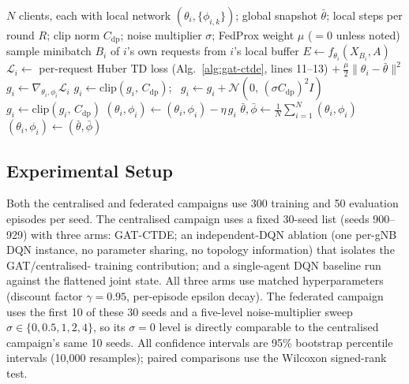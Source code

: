 \documentclass[pdflatex,sn-basic,Numbered]{sn-jnl}%
\begin{document}
\begin{algorithm}[t]
\caption{Federated GAT-CTDE round with DP-SGD}
\label{alg:fed-dp}
\begin{algorithmic}[1]
\REQUIRE $N$ clients, each with local network $(\theta_i, \{\phi_{i,k}\})$; global snapshot $\bar\theta$; local steps per round $R$; clip norm $C_{\text{dp}}$; noise multiplier $\sigma$; FedProx weight $\mu$ ($=0$ unless noted)
    \STATE sample minibatch $B_i$ of $i$'s own requests from $i$'s local buffer
    \STATE $E \gets f_{\theta_i}(X_{B_i}, A)$ 
    \STATE $\mathcal{L}_i \gets$ per-request Huber TD loss (Alg.~\ref{alg:gat-ctde}, lines 11--13) $+\ \frac{\mu}{2}\lVert \theta_i - \bar\theta \rVert^2$ 
    \STATE $g_i \gets \nabla_{\theta_i,\phi_i} \mathcal{L}_i$
      \STATE $g_i \gets \text{clip}(g_i,\, C_{\text{dp}})$; \ $g_i \gets g_i + \mathcal{N}(0,\, (\sigma C_{\text{dp}})^2 I)$ 
    \ELSE
      \STATE $g_i \gets \text{clip}(g_i,\, C_{\text{dp}})$ 
    \ENDIF
    \STATE $(\theta_i, \phi_i) \gets (\theta_i, \phi_i) - \eta\, g_i$
  \ENDFOR
  \STATE $\bar\theta, \bar\phi \gets \frac{1}{N}\sum_{i=1}^N (\theta_i, \phi_i)$ 
    \STATE $(\theta_i, \phi_i) \gets (\bar\theta, \bar\phi)$ 
  \ENDFOR
\ENDFOR
\end{algorithmic}
\end{algorithm}

\subsection{Experimental Setup}
Both the centralised and federated campaigns use 300 training and 50
evaluation episodes per seed. The centralised campaign uses a fixed
30-seed list (seeds 900--929) with three arms: GAT-CTDE; an
independent-DQN ablation (one per-gNB DQN instance, no parameter
sharing, no topology information) that isolates the GAT/centralised-
training contribution; and a single-agent DQN baseline run against the
flattened joint state. All three arms use matched hyperparameters
(discount factor $\gamma=0.95$, per-episode epsilon decay). The
federated campaign uses the first 10 of these 30 seeds and a
five-level noise-multiplier sweep $\sigma \in \{0, 0.5, 1, 2, 4\}$, so
its $\sigma{=}0$ level is directly comparable to the centralised
campaign's same 10 seeds. All confidence intervals are 95\% bootstrap
percentile intervals (10{,}000 resamples); paired comparisons use the
Wilcoxon signed-rank test.
\end{document}

